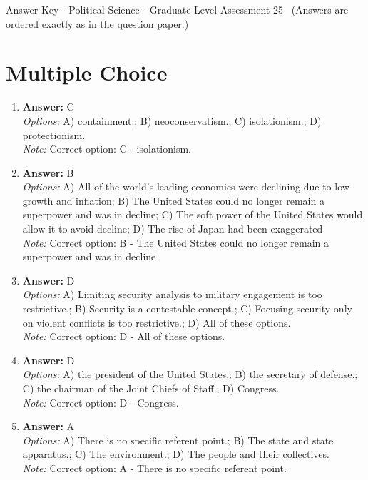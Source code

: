 \documentclass[12pt]{article}
\begin{document}
\begin{center}
Answer Key - Political Science - Graduate Level Assessment 25 \
\small (Answers are ordered exactly as in the question paper.)
\end{center}

\section*{Multiple Choice}
\begin{enumerate}[label=\arabic*.]
\item \textbf{Answer:} C
\\ \textit{Options:} A) containment.; B) neoconservatism.; C) isolationism.; D) protectionism.
\\ \textit{Note:} Correct option: C - isolationism.
\item \textbf{Answer:} B
\\ \textit{Options:} A) All of the world's leading economies were declining due to low growth and inflation; B) The United States could no longer remain a superpower and was in decline; C) The soft power of the United States would allow it to avoid decline; D) The rise of Japan had been exaggerated
\\ \textit{Note:} Correct option: B - The United States could no longer remain a superpower and was in decline
\item \textbf{Answer:} D
\\ \textit{Options:} A) Limiting security analysis to military engagement is too restrictive.; B) Security is a contestable concept.; C) Focusing security only on violent conflicts is too restrictive.; D) All of these options.
\\ \textit{Note:} Correct option: D - All of these options.
\item \textbf{Answer:} D
\\ \textit{Options:} A) the president of the United States.; B) the secretary of defense.; C) the chairman of the Joint Chiefs of Staff.; D) Congress.
\\ \textit{Note:} Correct option: D - Congress.
\item \textbf{Answer:} A
\\ \textit{Options:} A) There is no specific referent point.; B) The state and state apparatus.; C) The environment.; D) The people and their collectives.
\\ \textit{Note:} Correct option: A - There is no specific referent point.
\end{enumerate}
\end{document}
